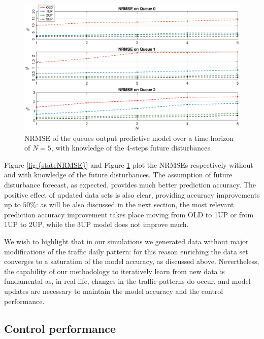 \begin{figure}[th!]
	\centering
	\includegraphics[trim={120 0 120 0}, width=0.9\linewidth]{figure/Error_State_ddM4.eps}
	\caption{NRMSE of the queues output predictive model over a time horizon of $N=5$, with knowledge of the 4-steps future disturbances}
	\label{fig:{stateNRMSEddM4}}
\end{figure}

Figure \ref{fig:{stateNRMSE}} and Figure \ref{fig:{stateNRMSEddM4}} plot the NRMSEs respectively without and with knowledge of the future disturbances. The assumption of future disturbance forecast, as expected, provides much better prediction accuracy. The positive effect of updated data sets is also clear, providing accuracy improvements up to $50 \%$: as will be also discussed in the next section, the most relevant prediction accuracy improvement takes place moving from OLD to 1UP or from 1UP to 2UP, while the 3UP model does not improve much.

\begin{remark}
We wish to highlight that in our simulations we generated data without major modifications of the traffic daily pattern: for this reason enriching the data set converges to a saturation of the model accuracy, as discussed above. Nevertheless, the capability of our methodology to iteratively learn from new data is fundamental as, in real life, changes in the traffic patterns do occur, and model updates are necessary to maintain the model accuracy and the control performance. 
\end{remark}


\subsection{Control performance}

